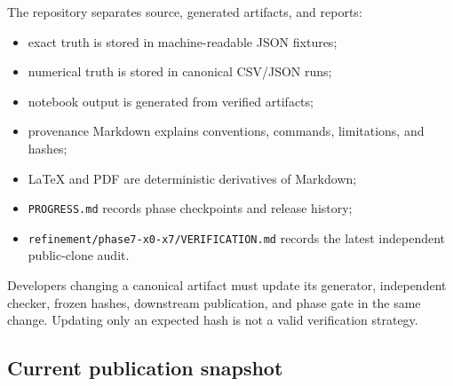 \documentclass[11pt]{article}
\begin{document}
The repository separates source, generated artifacts, and reports:

\begin{itemize}
\item exact truth is stored in machine-readable JSON fixtures;
\item numerical truth is stored in canonical CSV/JSON runs;
\item notebook output is generated from verified artifacts;
\item provenance Markdown explains conventions, commands, limitations, and hashes;
\item LaTeX and PDF are deterministic derivatives of Markdown;
\item \texttt{PROGRESS\allowbreak{}.md} records phase checkpoints and release history;
\item \texttt{refineme\allowbreak{}nt/phase\allowbreak{}7-x0-x7/\allowbreak{}VERIFICA\allowbreak{}TION.md} records the latest independent
public-clone audit.

\end{itemize}

Developers changing a canonical artifact must update its generator, independent checker, frozen hashes, downstream publication, and phase gate in the same change. Updating only an expected hash is not a valid verification strategy.

\subsection{Current publication snapshot}
\end{document}
